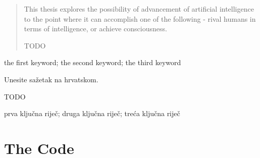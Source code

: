 \documentclass[masterthesis]{fer}
\begin{document}
\blindtext








\begin{abstract}
  This thesis explores the possibility of advancement of artificial intelligence to the point where it can accomplish one of the following - rival humans in terms of intelligence, or achieve consciousness. 
  
  TODO
\end{abstract}

\begin{keywords}
  the first keyword; the second keyword; the third keyword
\end{keywords}


\begin{sazetak}
  Unesite sažetak na hrvatskom.

  TODO
\end{sazetak}

\begin{kljucnerijeci}
  prva ključna riječ; druga ključna riječ; treća ključna riječ
\end{kljucnerijeci}




\backmatter

\chapter{The Code}

\Blindtext
\end{document}
